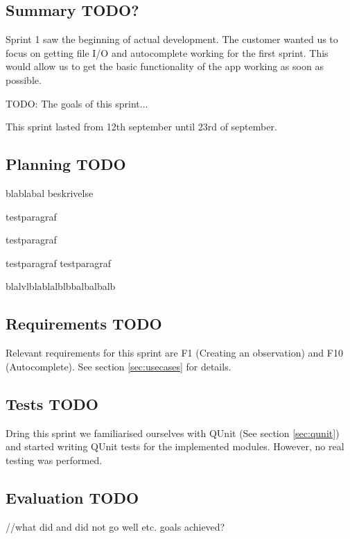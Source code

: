 \subsection{Summary TODO?}

	Sprint 1 saw the beginning of actual development. The customer wanted us to focus on getting file I/O and autocomplete working for the first sprint. This would allow us to get the basic functionality of the app working as soon as possible.
	
	TODO:
	The goals of this sprint...

	This sprint lasted from 12th september until 23rd of september.
 
\subsection{Planning TODO}
	blablabal beskrivelse

	testparagraf

	testparagraf

	testparagraf testparagraf

	blalvlblablalblbbalbalbalb


\subsection{Requirements TODO}

	Relevant requirements for this sprint are F1 (Creating an observation) and F10 (Autocomplete). See section \ref{sec:usecases} for details.


\subsection{Tests TODO}
	Dring this sprint we familiarised ourselves with QUnit (See section \ref{sec:qunit}) and started writing QUnit tests for the implemented modules. However, no real testing was performed.

\subsection{Evaluation TODO}
	//what did and did not go well etc. goals achieved?
